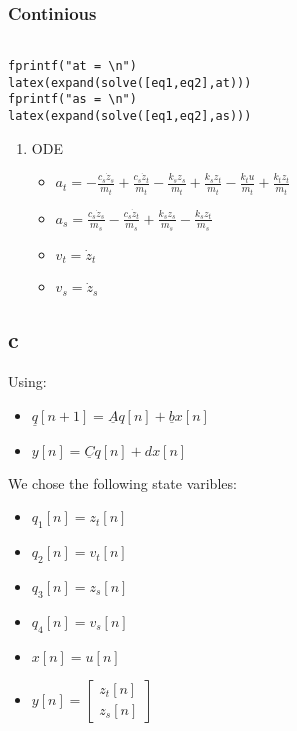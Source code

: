 \documentclass[11pt]{article}
\begin{document}
\subsubsection{Continious}
\label{sec:org1ddf125}
\begin{verbatim}

fprintf("at = \n")
latex(expand(solve([eq1,eq2],at)))
fprintf("as = \n")
latex(expand(solve([eq1,eq2],as)))

\end{verbatim}
\begin{enumerate}
\item ODE
\label{sec:org6cebd75}
\begin{itemize}
\item \(a_t=-\frac{c_s \dot{z}_s}{m_t} + \frac{c_s \dot{z}_t}{m_t} - \frac{k_s z_s}{m_t} + \frac{k_s z_t}{m_t} - \frac{k_t u}{m_t} + \frac{k_t z_t}{m_t}\)
\item \(a_s=\frac{c_s \dot{z}_s}{m_s} - \frac{c_s \dot{z}_t}{m_s} + \frac{k_s z_s}{m_s} - \frac{k_s z_t}{m_s}\)
\item \(v_t=\dot{z}_t\)
\item \(v_s=\dot{z}_s\)
\end{itemize}
\end{enumerate}
\subsection{c}
\label{sec:orgca15acf}


Using:
\begin{itemize}
\item \(\underline{q}[n+1]=\underline{A}q[n]+\underline{b}x[n]\)
\item \(y[n]=\underline{C}q[n]+dx[n]\)
\end{itemize}
We chose the following state varibles:

\begin{itemize}
\item \(q_1[n] = z_t[n]\)
\item \(q_2[n] = v_t[n]\)
\item \(q_3[n] = z_s[n]\)
\item \(q_4[n] = v_s[n]\)
\item \(x[n] = u[n]\)
\item \(y[n] = \begin{bmatrix} z_t[n] \\ z_s[n] \end{bmatrix}\)
\end{itemize}
\end{document}
